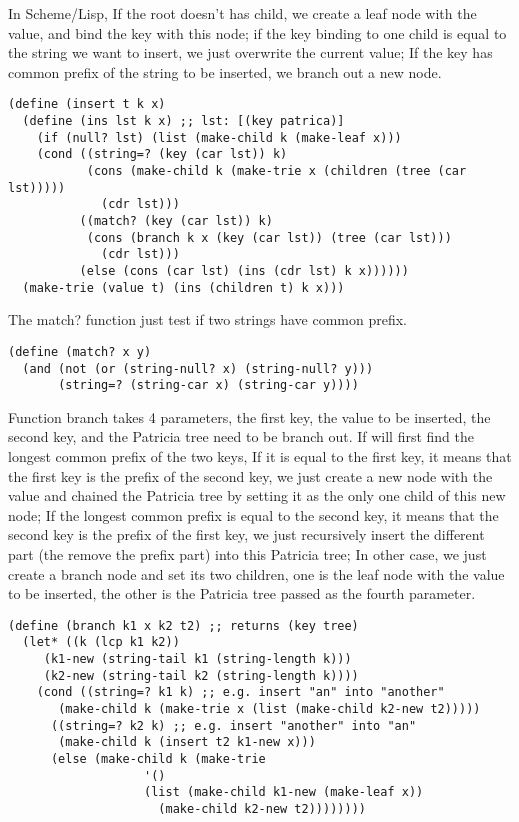 \documentclass{article}
\begin{document}
In Scheme/Lisp, If the root doesn't has child, we create a leaf node
with the value, and bind the key with this node; if the key binding to
one child is equal to the string we want to insert, we just overwrite
the current value; If the key has common prefix of the string to be
inserted, we branch out a new node.

\lstset{language=lisp}
\begin{lstlisting}
(define (insert t k x)
  (define (ins lst k x) ;; lst: [(key patrica)]
    (if (null? lst) (list (make-child k (make-leaf x)))
	(cond ((string=? (key (car lst)) k)
	       (cons (make-child k (make-trie x (children (tree (car lst)))))
		     (cdr lst)))
	      ((match? (key (car lst)) k)
	       (cons (branch k x (key (car lst)) (tree (car lst)))
		     (cdr lst)))
	      (else (cons (car lst) (ins (cdr lst) k x))))))
  (make-trie (value t) (ins (children t) k x)))
\end{lstlisting}

The match? function just test if two strings have common prefix.

\begin{lstlisting}
(define (match? x y)
  (and (not (or (string-null? x) (string-null? y)))
       (string=? (string-car x) (string-car y))))
\end{lstlisting}

Function branch takes 4 parameters, the first key, the value to be
inserted, the second key, and the Patricia tree need to be branch
out. If will first find the longest common prefix of the two keys, If
it is equal to the first key, it means that the first key is the prefix of
the second key, we just create a new node with the value and chained
the Patricia tree by setting it as the only one child of this new
node; If the longest common prefix is equal to the second key, it
means that the second key is the prefix of the first key, we just
recursively insert the different part (the remove the prefix part)
into this Patricia tree; In other case, we just create a branch node
and set its two children, one is the leaf node with the value to be
inserted, the other is the Patricia tree passed as the fourth parameter.

\begin{lstlisting}
(define (branch k1 x k2 t2) ;; returns (key tree)
  (let* ((k (lcp k1 k2))
	 (k1-new (string-tail k1 (string-length k)))
	 (k2-new (string-tail k2 (string-length k))))
    (cond ((string=? k1 k) ;; e.g. insert "an" into "another"
	   (make-child k (make-trie x (list (make-child k2-new t2)))))
	  ((string=? k2 k) ;; e.g. insert "another" into "an"
	   (make-child k (insert t2 k1-new x)))
	  (else (make-child k (make-trie 
			       '() 
			       (list (make-child k1-new (make-leaf x))
				     (make-child k2-new t2))))))))
\end{lstlisting}
\end{document}
